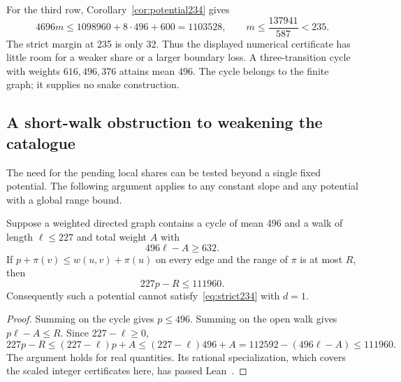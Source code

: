 For the third row, Corollary~\ref{cor:potential234} gives
\[
4696m\le1098960+8\cdot496+600=1103528,
\qquad m\le\frac{137941}{587}<235.
\]
The strict margin at 235 is only 32. Thus the displayed numerical certificate has little room for a weaker share or a larger boundary loss. A three-transition cycle with weights $616,496,376$ attains mean 496. The cycle belongs to the finite graph; it supplies no snake construction.

\subsection{A short-walk obstruction to weakening the catalogue}\label{sec:short-walk}
The need for the pending local shares can be tested beyond a single fixed potential. The following argument applies to any constant slope and any potential with a global range bound.

\begin{proposition}\label{prop:short-walk-obstruction}
Suppose a weighted directed graph contains a cycle of mean 496 and a walk of length $\ell\le227$ and total weight $A$ with
\[
496\ell-A\ge632.
\]
If $p+\pi(v)\le w(u,v)+\pi(u)$ on every edge and the range of $\pi$ is at most $R$, then
\[
227p-R\le111960.
\]
Consequently such a potential cannot satisfy~\eqref{eq:strict234} with $d=1$.
\end{proposition}
\begin{proof}
Summing on the cycle gives $p\le496$. Summing on the open walk gives $p\ell-A\le R$. Since $227-\ell\ge0$,
\[
227p-R\le(227-\ell)p+A
\le(227-\ell)496+A
=112592-(496\ell-A)\le111960.
\]
The argument holds for real quantities. Its rational specialization, which covers the scaled integer certificates here, has passed Lean~\cite{obstructionarchive}.
\end{proof}

